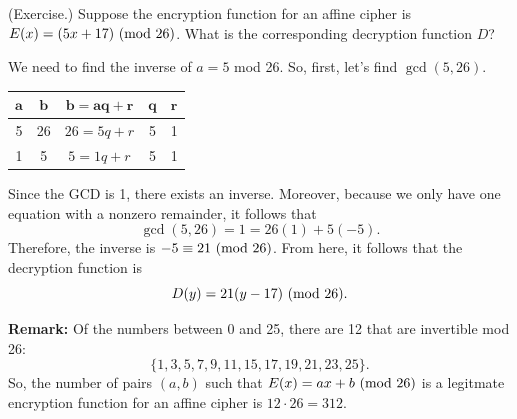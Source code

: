 \documentclass[letterpaper]{article}
\begin{document}
\begin{mdframed}
    (Exercise.) Suppose the encryption function for an affine cipher is $E(x) = (5x + 17) \ (\mathrm{mod}\ 26)$. What is the corresponding decryption function $D$? 

    \begin{mdframed}
        We need to find the inverse of $a = 5$ mod 26. So, first, let's find $\gcd(5, 26)$.
        \begin{center}
            \begin{tabular}{|c|c|c|c|c|}
                \hline 
                $\mathbf{a}$ & $\mathbf{b}$ & $\mathbf{b = aq + r}$ & $\mathbf{q}$ & $\mathbf{r}$ \\ 
                \hline 
                5 & 26 & $26 = 5q + r$ & 5 & 1 \\ 
                1 & 5 & $5 = 1q + r$ & 5 & 1 \\ 
                \hline 
            \end{tabular}
        \end{center}
        Since the GCD is 1, there exists an inverse. Moreover, because we only have one equation with a nonzero remainder, it follows that 
        \[\gcd(5, 26) = 1 = 26(1) + 5(-5).\]
        Therefore, the inverse is $-5 \equiv 21 \ (\mathrm{mod}\ 26)$. From here, it follows that the decryption function is \[D(y) = 21(y - 17) \ (\mathrm{mod}\ 26).\]
    \end{mdframed}
\end{mdframed}
\textbf{Remark:} Of the numbers between 0 and 25, there are 12 that are invertible mod 26: 
\[\{1, 3, 5, 7, 9, 11, 15, 17, 19, 21, 23, 25\}.\]
So, the number of pairs $(a, b)$ such that $E(x) = ax + b \ (\mathrm{mod}\ 26)$ is a legitmate encryption function for an affine cipher is $12 \cdot 26 = 312$. 
\end{document}
